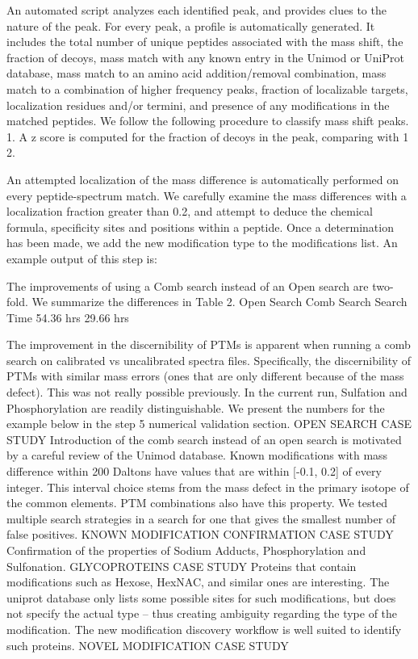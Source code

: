\documentclass[journal=jprobs,manuscript=article]{achemso}
\begin{document}
An automated script analyzes each identified peak, and provides clues to the nature of the peak. For every peak, a profile is automatically generated. It includes the total number of unique peptides associated with the mass shift, the fraction of decoys, mass match with any known entry in the Unimod or UniProt database, mass match to an amino acid addition/removal combination, mass match to a combination of higher frequency peaks, fraction of localizable targets, localization residues and/or termini, and presence of any modifications in the matched peptides. We follow the following procedure to classify mass shift peaks. 
1.	A z score is computed for the fraction of decoys in the peak, comparing with 1%
2.	

An attempted localization of the mass difference is automatically performed on every peptide-spectrum match. We carefully examine the mass differences with a localization fraction greater than 0.2, and attempt to deduce the chemical formula, specificity sites and positions within a peptide. Once a determination has been made, we add the new modification type to the modifications list.
An example output of this step is:
 

The improvements of using a Comb search instead of an Open search are two-fold. We summarize the differences in Table 2.
	Open Search	Comb Search
Search Time	54.36 hrs	29.66 hrs
 
The improvement in the discernibility of PTMs is apparent when running a comb search on calibrated vs uncalibrated spectra files. Specifically, the discernibility of PTMs with similar mass errors (ones that are only different because of the mass defect). This was not really possible previously. In the current run, Sulfation and Phosphorylation are readily distinguishable. We present the numbers for the example below in the step 5 numerical validation section.
OPEN SEARCH CASE STUDY
Introduction of the comb search instead of an open search is motivated by a careful review of the Unimod database. Known modifications with mass difference within 200 Daltons have values that are within [-0.1, 0.2] of every integer. This interval choice stems from the mass defect in the primary isotope of the common elements. PTM combinations also have this property.
We tested multiple search strategies in a search for one that gives the smallest number of false positives. 
KNOWN MODIFICATION CONFIRMATION CASE STUDY
Confirmation of the properties of Sodium Adducts, Phosphorylation and Sulfonation.
GLYCOPROTEINS CASE STUDY
Proteins that contain modifications such as Hexose, HexNAC, and similar ones are interesting. The uniprot database only lists some possible sites for such modifications, but does not specify the actual type – thus creating ambiguity regarding the type of the modification. The new modification discovery workflow is well suited to identify such proteins. 
NOVEL MODIFICATION CASE STUDY
\end{document}
